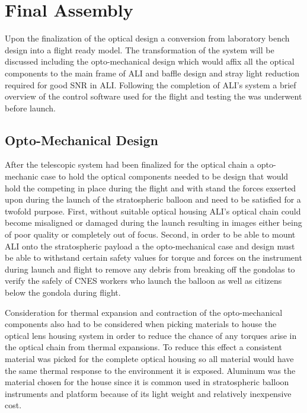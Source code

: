 \section{Final Assembly}

Upon the finalization of the optical design a conversion from laboratory bench design into a flight ready model. The transformation of the system will be discussed including the opto-mechanical design which would affix all the optical components to the main frame of ALI and baffle design and stray light reduction required for good SNR in ALI. Following the completion of ALI's system a brief overview of the control software used for the flight and testing the was underwent before launch.

\subsection{Opto-Mechanical Design}

After the telescopic system had been finalized for the optical chain a opto-mechanic case to hold the optical components needed to be design that would hold the competing in place during the flight and with stand the forces exserted upon during the launch of the stratospheric balloon and need to be satisfied for a twofold purpose. First, without suitable optical housing ALI's optical chain could become misaligned or damaged during the launch resulting in images either being of poor quality or completely out of focus. Second, in order to be able to mount ALI onto the stratospheric payload a the opto-mechanical case and design must be able to withstand certain safety values for torque and forces on the instrument during launch and flight to remove any debris from breaking off the gondolas to verify the safely of CNES workers who launch the balloon as well as citizens below the gondola during flight.

Consideration for thermal expansion and contraction of the opto-mechanical components also had to be considered when picking materials to house the optical lens housing system in order to reduce the chance of any torques arise in the optical chain from thermal expansions. To reduce this effect a consistent material was picked for the complete optical housing so all material would have the same thermal response to the environment it is exposed. Aluminum was the material chosen for the house since it is common used in stratospheric balloon instruments and platform because of its light weight and relatively inexpensive cost.

